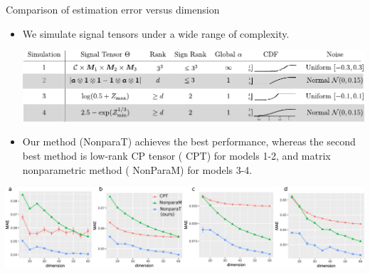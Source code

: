 \documentclass[10pt, mathserif]{beamer} %
\theoremstyle{definition}
\theoremstyle{plain}
\begin{document}
\begin{frame}{Comparison of estimation error versus dimension}

    \begin{itemize}
\item We simulate signal tensors under a wide range of complexity.    

       \begin{center}
        \includegraphics[width = \textwidth]{Figures/simulation_new.pdf}
        \end{center}

\pause
    \item Our method ({\color{blue}NonparaT}) achieves the best performance, whereas the second best method is low-rank CP tensor ({\color{red} CPT}) for models 1-2, and matrix nonparametric method ({\color{darkgreen} NonParaM}) for models 3-4.
  \end{itemize}
    
          \begin{center}
    \includegraphics[width =\textwidth]{Figures/fig1-4v2.pdf}
    \end{center}
    
        
\end{frame}
\end{document}
